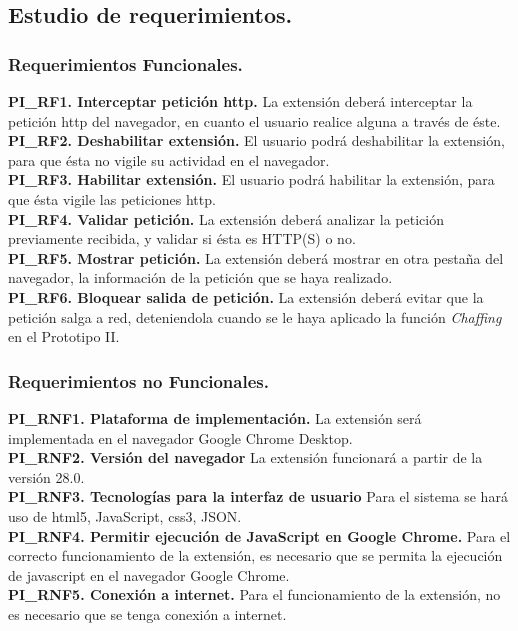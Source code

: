 \documentclass[12pt, a4paper, titlepage]{report}
\begin{document}
			\subsection{Estudio de requerimientos.}
				\subsubsection{Requerimientos Funcionales.}
				{\setlength{\parindent}{12pt}
				\textbf{PI\_RF1. Interceptar petición \acrshort{http}.} La extensión deberá interceptar la petición \acrshort{http} del navegador, en cuanto el usuario realice alguna a través de éste.\\

				\textbf{PI\_RF2. Deshabilitar extensión.} El usuario podrá deshabilitar la extensión, para que ésta no vigile su actividad en el navegador.\\
				
				\textbf{PI\_RF3. Habilitar extensión.} El usuario podrá habilitar la extensión, para que ésta vigile las peticiones \acrshort{http}.\\
				
				\textbf{PI\_RF4. Validar petición.} La extensión deberá analizar la petición previamente recibida, y validar si ésta es HTTP(S) o no.\\
				
				\textbf{PI\_RF5. Mostrar petición.} La extensión deberá mostrar en otra pestaña del navegador, la información de la petición que se haya realizado.\\
				
				\textbf{PI\_RF6. Bloquear salida de petición.} La extensión deberá evitar que la petición salga a red, deteniendola cuando se le haya aplicado la función \textit{Chaffing} en el Prototipo II. 
		        }
				
				\subsubsection{Requerimientos no Funcionales.}
				{\setlength{\parindent}{12pt}
				
				\textbf{PI\_RNF1. Plataforma de implementación.} La extensión será implementada en el navegador Google Chrome Desktop.\\
				
				\textbf{PI\_RNF2. Versión del navegador} La extensión funcionará a partir de la versión 28.0.\\
				
				\textbf{PI\_RNF3. Tecnologías para la interfaz de usuario} Para el sistema se hará uso de \acrshort{html}5, JavaScript, \acrshort{css}3, JSON.\\
				
				\textbf{PI\_RNF4. Permitir ejecución de JavaScript en Google Chrome.} Para el correcto funcionamiento de la extensión, es necesario que se permita la ejecución de javascript en el navegador Google Chrome.\\
				
				\textbf{PI\_RNF5. Conexión a internet.} Para el funcionamiento de la extensión, no es necesario que se tenga conexión a internet.
				}
			
\end{document}
